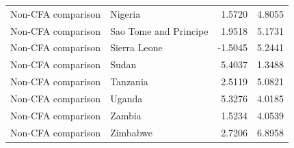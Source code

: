 \begin{table}
\begin{tabular}[t]{llrr}
Non-CFA comparison & Nigeria & 1.5720 & 4.8055\\
Non-CFA comparison & Sao Tome and Principe & 1.9518 & 5.1731\\
Non-CFA comparison & Sierra Leone & -1.5045 & 5.2441\\
\addlinespace
Non-CFA comparison & Sudan & 5.4037 & 1.3488\\
Non-CFA comparison & Tanzania & 2.5119 & 5.0821\\
Non-CFA comparison & Uganda & 5.3276 & 4.0185\\
Non-CFA comparison & Zambia & 1.5234 & 4.0539\\
Non-CFA comparison & Zimbabwe & 2.7206 & 6.8958\\
\bottomrule
\end{tabular}
\end{table}
